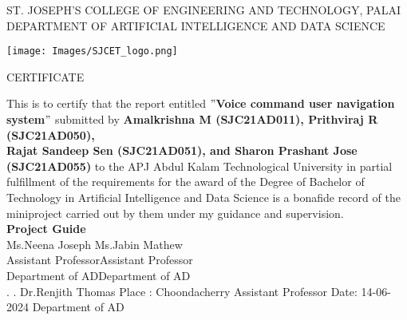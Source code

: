 \newpage
\thispagestyle{empty}
\begin{center}
\normalsize{ST. JOSEPH’S COLLEGE OF ENGINEERING AND TECHNOLOGY, PALAI}\\[0.5cm]
\normalsize
 { DEPARTMENT OF ARTIFICIAL INTELLIGENCE AND DATA SCIENCE}\\[1.0cm]%
   \begin{center}
   \texttt{[image: Images/SJCET\_logo.png]}
   \end{center}
{\large CERTIFICATE}\\[1.5cm]
\end{center}
\normalsize 
This is to certify that the report entitled {\bf $"$Voice command user navigation system$"$} submitted by { \bf Amalkrishna M (SJC21AD011), Prithviraj R (SJC21AD050),\\Rajat Sandeep Sen (SJC21AD051), and Sharon Prashant Jose (SJC21AD055)} to the APJ Abdul Kalam Technological University in partial fulfillment of the requirements for the award of the Degree of Bachelor of Technology in Artificial Intelligence and Data Science is a bonafide record of the miniproject carried out by them under my guidance and supervision.\vspace{1.2 cm}\\
{\bf Project Guide}\hspace{8.35 cm}{\bf Project Coordinator}\\
Ms.Neena Joseph\hspace{8.0 cm} Ms.Jabin Mathew\\
Assistant Professor\hspace{7.76 cm}Assistant Professor\hspace{2.7 cm}\\Department of AD\hspace{7.8 cm}Department of AD
\vspace{1.0 cm}\\
.\hspace{11.06 cm}{\bf Head of the Department}
\newline
.\hspace{11.01 cm} Dr.Renjith Thomas
\newline
Place : Choondacherry  \hspace{6.87 cm} Assistant Professor
\newline
Date\hspace{0.25 cm}: 14-06-2024 \hspace{7.7 cm} Department of AD
                
